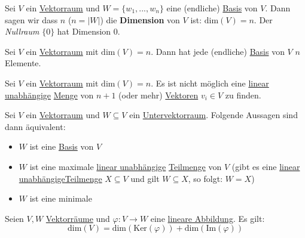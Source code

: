 \documentclass[../../main.tex]{subfiles}
\begin{document}
	\begin{definition}[Dimension]
		Sei $V$ ein \hyperref[def:Vektorraum]{Vektorraum} und $W = \{w_1,...,w_n\}$ eine (endliche) \hyperref[def:Basis]{Basis} von $V$. Dann sagen wir dass $n$ ($n=|W|$) die \textbf{Dimension} von $V$ ist: $\textrm{dim}(V)=n$. Der \textit{Nullraum} $\{0\}$ hat Dimension 0. 
	\end{definition}

	\begin{theorem}
		Sei $V$ ein \hyperref[def:Vektorraum]{Vektorraum} mit $\textrm{dim}(V)=n$. Dann hat jede (endliche) \hyperref[def:Basis]{Basis} von $V$ $n$ Elemente.
	\end{theorem}

	\begin{theorem}
		Sei $V$ ein \hyperref[def:Vektorraum]{Vektorraum} mit $\textrm{dim}(V)=n$. Es ist nicht möglich eine \hyperref[def:LineareUnabhängigkeitMenge]{linear unabhängige} \hyperref[def:Menge]{Menge} von $n+1$ (oder mehr) \hyperref[def:Vektor]{Vektoren} $v_i \in V$ zu finden.
	\end{theorem}

	\begin{theorem}
		Sei $V$ ein \hyperref[def:Vektorraum]{Vektorraum} und $W \subseteq V$ ein \hyperref[def:Untervektorraum]{Untervektorraum}. Folgende Aussagen sind dann äquivalent:
		\begin{itemize}
			\item $W$ ist eine \hyperref[def:Basis]{Basis} von $V$
			\item $W$ ist eine maximale \hyperref[def:LineareUnabhängigkeitMenge]{linear unabhängige} \hyperref[def:Teilmenge]{Teilmenge} von $V$ (gibt es eine \hyperref[def:LineareUnabhängigkeitMenge]{linear unabhängige}\hyperref[def:Teilmenge]{Teilmenge} $X \subseteq V$ und gilt $W \subseteq X$, so folgt: $W = X$)
			\item $W$ ist eine minimale 
		\end{itemize}
	\end{theorem}

	\begin{theorem}
		Seien $V, W$ \hyperref[def:Vektorraum]{Vektorräume} und $\varphi: V \rightarrow W$ eine \hyperref[def:LineareAbbildung]{lineare Abbildung}. Es gilt: $$\textrm{dim}(V) = \textrm{dim}(\textrm{Ker}(\varphi)) + \textrm{dim}(\textrm{Im}(\varphi))$$
	\end{theorem}
\end{document}
